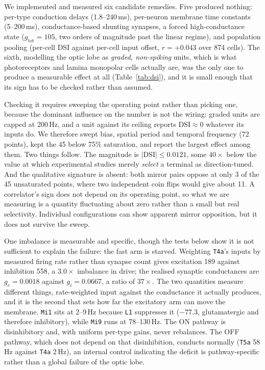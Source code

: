 \documentclass[10pt,twoside]{article}
\newcommand{\cell}[1]{\texttt{#1}}
\begin{document}
We implemented and measured six candidate remedies. Five produced nothing:
per-type conduction delays (1.8--240\,ms), per-neuron membrane time constants
(5--200\,ms), conductance-based shunting synapses, a forced high-conductance
state ($g_{\mathrm{tot}}=105$, two orders of magnitude past the linear regime),
and population pooling (per-cell DSI against per-cell input offset, $r=+0.043$
over 874 cells). The sixth, modelling the optic lobe as \emph{graded,
non-spiking} units, which is what photoreceptors and lamina monopolar cells
actually are, was the only one to produce a measurable effect at all
(Table~\ref{tab:dsi}), and it is small enough that its sign has to be checked
rather than assumed.

Checking it requires sweeping the operating point rather than picking one,
because the dominant influence on the number is not the wiring: graded units
are capped at 200\,Hz, and a unit against its ceiling reports
$\mathrm{DSI}\approx0$ whatever its inputs do. We therefore swept bias, spatial
period and temporal frequency (72 points), kept the 45 below 75\% saturation,
and report the largest effect among them. Two things follow. The magnitude is
$|\mathrm{DSI}|\leq0.0121$, some $40\times$ below the value at which
experimental studies merely \emph{select} a terminal as direction-tuned. And
the qualitative signature is absent: both mirror pairs oppose at only 3 of the
45 unsaturated points, where two independent coin flips would give about 11. A
correlator's sign does not depend on its operating point, so what we are
measuring is a quantity fluctuating about zero rather than a small but real
selectivity. Individual configurations can show apparent mirror opposition, but it does not
survive the sweep.



One imbalance is measurable and specific, though the tests below show it is
not sufficient to explain the failure: the fast arm is starved.
Weighting \cell{T4a}'s inputs by measured firing rate rather than synapse count
gives excitation 189 against inhibition 558, a $3.0\times$ imbalance in drive;
the realised synaptic conductances are $g_e=0.0018$ against $g_i=0.0667$, a
ratio of $37\times$. The two quantities measure different things,
rate-weighted input against the conductance it actually produces, and it is
the second that sets how far the excitatory arm can move the membrane.
\cell{Mi1} sits at 2--9\,Hz because \cell{L1} suppresses it ($-77.3$,
glutamatergic and therefore inhibitory), while \cell{Mi9} runs at
78--130\,Hz. The ON pathway is disinhibitory and, with uniform per-type gains,
never rebalances. The OFF pathway, which does not depend on that
disinhibition, conducts normally (\cell{T5a} 58\,Hz against \cell{T4a} 2\,Hz),
an internal control indicating the deficit is pathway-specific rather than
a global failure of the optic lobe.
\end{document}

